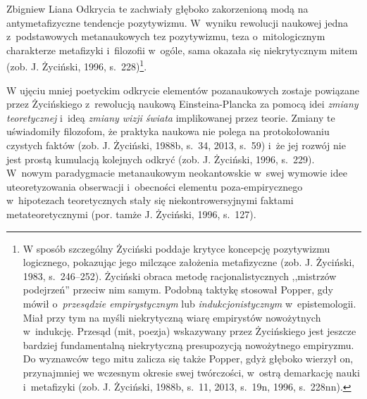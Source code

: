 \begin{artplenv}{Zbigniew Liana}
Odkrycia te zachwiały głęboko zakorzenioną modą na antymetafizyczne tendencje pozytywizmu. W~wyniku rewolucji naukowej
jedna z~podstawowych metanaukowych tez pozytywizmu, teza o~mitologicznym charakterze metafizyki i~filozofii w~ogóle,
sama okazała się niekrytycznym mitem \label{ref:RNDw5Xs923WOa}(zob. J. Życiński, 1996, s.~228)\footnote{W sposób
szczególny Życiński poddaje krytyce koncepcję pozytywizmu logicznego, pokazując jego milczące założenia metafizyczne
\label{ref:RNDk96fcXirdq}(zob. J. Życiński, 1983, s.~246–252). Życiński obraca metodę racjonalistycznych ,,mistrzów
podejrzeń'' przeciw nim samym. Podobną taktykę stosował Popper, gdy mówił o~\textit{przesądzie empirystycznym} lub
\textit{indukcjonistycznym} w~epistemologii. Miał przy tym na myśli niekrytyczną wiarę empirystów nowożytnych w~indukcję.
Przesąd (mit, poezja) wskazywany przez Życińskiego jest jeszcze bardziej fundamentalną niekrytyczną presupozycją
nowożytnego empiryzmu. Do wyznawców tego mitu zalicza się także Popper, gdyż głęboko wierzył on, przynajmniej we
wczesnym okresie swej twórczości, w~ostrą demarkację nauki i~metafizyki \label{ref:RNDdtZAuOTDND}(zob. J. Życiński,
1988b, s.~11, 2013, s.~19n, 1996, s.~228nn). }.

W ujęciu mniej poetyckim odkrycie elementów pozanaukowych zostaje powiązane przez Życińskiego z~rewolucją naukową
Einsteina-Plancka za pomocą idei \textit{zmiany teoretycznej} i~ideą \textit{zmiany wizji świata} implikowanej przez
teorie. Zmiany te uświadomiły filozofom, że praktyka naukowa nie polega na protokołowaniu czystych faktów
\label{ref:RNDi0g21xRjLd}(zob. J. Życiński, 1988b, s.~34, 2013, s.~59) i~że jej rozwój nie jest prostą kumulacją
kolejnych odkryć \label{ref:RNDl7y894RdpX}(zob. J. Życiński, 1996, s.~229). W~nowym paradygmacie metanaukowym
neokantowskie w~swej wymowie idee uteoretyzowania obserwacji i~obecności elementu poza-empirycznego w~hipotezach
teoretycznych stały się niekontrowersyjnymi faktami metateoretycznymi \label{ref:RNDLhcTxbq259}(por. tamże J. Życiński,
1996, s.~127).


\end{artplenv}
